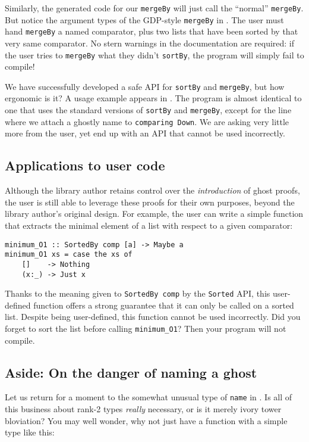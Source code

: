 \documentclass[format=sigplan, review=false, screen=true]{acmart}
\begin{document}
Similarly, the generated code for our \texttt{mergeBy} will just call the ``normal'' \texttt{mergeBy}.
But notice the argument types of the GDP-style \texttt{mergeBy} in . The user
must hand \texttt{mergeBy} a named comparator, plus two lists that have been sorted by that very same
comparator. No stern warnings in the documentation are required: if the user tries to \texttt{mergeBy}
what they didn't \texttt{sortBy}, the program will simply fail to compile!

We have successfully developed a safe API for \texttt{sortBy} and \texttt{mergeBy}, but how ergonomic
is it? A usage example appears in . The program is almost identical to one
that uses the standard versions of \texttt{sortBy} and \texttt{mergeBy}, except for the line where
we attach a ghostly name to \texttt{comparing Down}. We are asking very little more from the user,
yet end up with an API that cannot be used incorrectly.

\subsection{Applications to user code}
Although the library author retains control over the \emph{introduction} of ghost proofs, the
user is still able to leverage these proofs for their own purposes, beyond the library author's original
design. For example, the user can write a simple function that extracts the minimal element of
a list with respect to a given comparator:
\begin{verbatim}
minimum_O1 :: SortedBy comp [a] -> Maybe a
minimum_O1 xs = case the xs of
    []    -> Nothing
    (x:_) -> Just x
\end{verbatim}
Thanks to the meaning given to \texttt{SortedBy comp} by the \texttt{Sorted} API, this user-defined
function offers a strong guarantee that it can only be called on a sorted list. Despite being user-defined,
this function cannot be used incorrectly. Did you forget to sort the list before calling \texttt{minimum\_O1}?
Then your program will not compile.

\subsection{Aside: On the danger of naming a ghost}\label{ghost-danger}

Let us return for a moment to the somewhat unusual type of \texttt{name} in .
Is all of this business about rank-2 types \emph{really} necessary, or is it merely ivory tower
bloviation?  You may well wonder, why not just have a function with a simple type like this:
\end{document}
